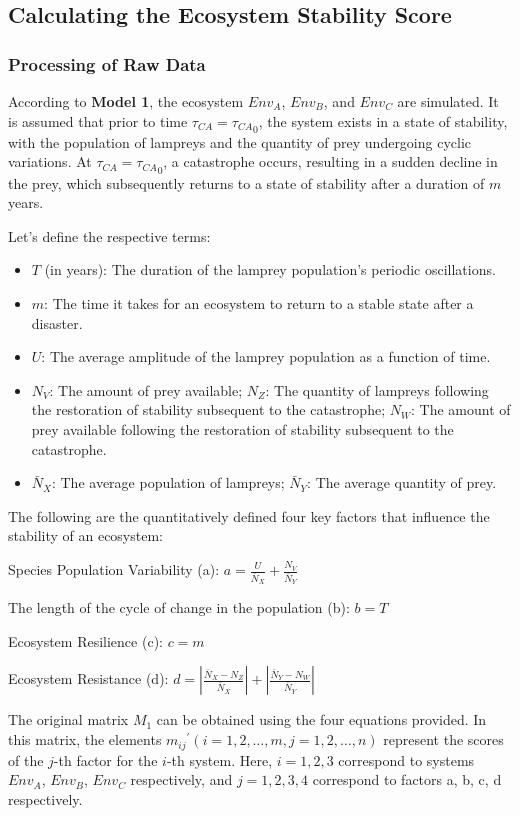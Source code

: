 \documentclass{mcmthesis}
\begin{document}
\subsection{Calculating the Ecosystem Stability Score}
\subsubsection{Processing of Raw Data}
According to \textbf{Model 1}, the ecosystem $Env_{A}$, $Env_{B}$, and $Env_{C}$ are simulated. It is assumed that prior to time $\tau_{CA}={\tau_{CA}}_0$, the system exists in a state of stability, with the population of lampreys and the quantity of prey undergoing cyclic variations. At $\tau_{CA}={\tau_{CA}}_0$, a catastrophe occurs, resulting in a sudden decline in the prey, which subsequently returns to a state of stability after a duration of $m$ years.

Let's define the respective terms:
\begin{itemize}
    \item $T$ (in years): The duration of the lamprey population's periodic oscillations.
    \item $m$: The time it takes for an ecosystem to return to a stable state after a disaster.
    \item $U$: The average amplitude of the lamprey population as a function of time.
    \item $N_V$: The amount of prey available; $N_Z$: The quantity of lampreys following the restoration of stability subsequent to the catastrophe; $N_W$: The amount of prey available following the restoration of stability subsequent to the catastrophe.
    \item $\bar{N}_X$: The average population of lampreys; $\bar{N}_Y$: The average quantity of prey.
\end{itemize}

The following are the quantitatively defined four key factors that influence the stability of an ecosystem:	

Species Population Variability (a): $ a=\frac{U}{\bar{N}_X}+\frac{N_V}{\bar{N}_Y} $

The length of the cycle of change in the population (b): $b=T$

Ecosystem Resilience (c):  $c=m$

Ecosystem Resistance (d): $d=|\frac{\bar{N}_X-N_Z}{\bar{N}_X}|+|\frac{\bar{N}_Y-N_W}{\bar{N}_Y}|$

The original matrix $M_1$ can be obtained using the four equations provided. In this matrix, the elements ${m_{ij}}^\prime(i=1,2,\ldots,m,j=1,2,\ldots,n)$ represent the scores of the $j$-th factor for the $i$-th system. Here, $i=1, 2, 3$ correspond to systems $Env_{A}$, $Env_{B}$, $Env_{C}$ respectively, and $j=1, 2, 3, 4$ correspond to factors a, b, c, d respectively.
\end{document}
